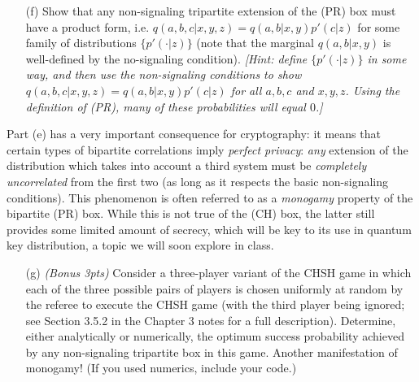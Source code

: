 \documentclass[12pt]{article}
\begin{document}
\begin{enumerate}
\begin{enumerate}
\item[(f)] Show that any non-signaling tripartite extension of the (PR) box must have a product form, i.e. $q(a,b,c|x,y,z) = q(a,b|x,y)p'(c|z)$ for some family of distributions $\{p'(\cdot|z)\}$ (note that the marginal $q(a,b|x,y)$ is well-defined by the no-signaling condition). \emph{[Hint: define $\{p'(\cdot|z)\}$ in some way, and then use the non-signaling conditions to show $q(a,b,c|x,y,z) = q(a,b|x,y)p'(c|z)$ for all $a,b,c$ and $x,y,z$. Using the definition of (PR), many of these probabilities will equal $0$.]}
\end{enumerate}
Part (e) has a very important consequence for cryptography: it means that certain types of bipartite correlations imply \emph{perfect privacy}: \emph{any} extension of the distribution which takes into account a third system must be \emph{completely uncorrelated} from the first two (as long as it respects the basic non-signaling conditions). This phenomenon is often referred to as a \emph{monogamy} property of the bipartite (PR) box. While this is not true of the (CH) box, the latter still provides some limited amount of secrecy, which will be key to its use in quantum key distribution, a topic we will soon explore in class. 
\begin{enumerate}
\item[(g)] \emph{(Bonus 3pts)} Consider a three-player variant of the CHSH game in which each of the three possible pairs of players is chosen uniformly at random by the referee to execute the CHSH game (with the third player being ignored; {\color{blue}see Section 3.5.2 in the Chapter 3 notes for a full description}). Determine, either analytically or numerically, the optimum success probability achieved by any non-signaling tripartite box in this game. Another manifestation of monogamy! (If you used numerics, include your code.)
\end{enumerate}




\end{enumerate}
\end{document}

